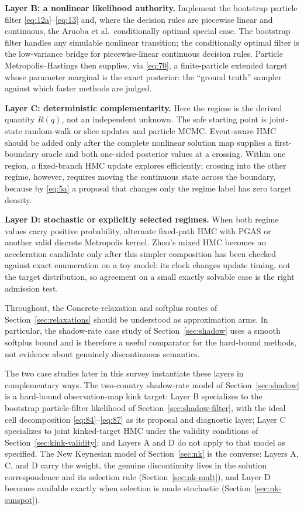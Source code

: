 \documentclass[11pt]{article}
\begin{document}
\textbf{Layer B: a nonlinear likelihood authority.} Implement the bootstrap
particle filter \eqref{eq:12a}--\eqref{eq:13} and, where the decision rules are
piecewise linear and continuous, the Aruoba et al.\ conditionally optimal
special case. The bootstrap filter handles any simulable nonlinear transition;
the conditionally optimal filter is the low-variance bridge for
piecewise-linear continuous decision rules. Particle Metropolis--Hastings then
supplies, via \eqref{eq:70}, a finite-particle extended target whose parameter
marginal is the exact posterior: the ``ground truth'' sampler against which
faster methods are judged.

\textbf{Layer C: deterministic complementarity.} Here the regime is the derived
quantity $R(q)$, not an independent unknown. The safe starting point is
joint-state random-walk or slice updates and particle MCMC. Event-aware HMC
should be added only after the complete nonlinear solution map supplies a
first-boundary oracle and both one-sided posterior values at a crossing.
Within one region, a fixed-branch HMC update explores efficiently; crossing
into the other regime, however, requires moving the continuous state across
the boundary, because by \eqref{eq:5a} a proposal that changes only the
regime label has zero target density.

\textbf{Layer D: stochastic or explicitly selected regimes.} When both regime
values carry positive probability, alternate fixed-path HMC with PGAS or
another valid discrete Metropolis kernel. Zhou's mixed HMC becomes an
acceleration candidate only after this simpler composition has been checked
against exact enumeration on a toy model: its clock changes update timing, not
the target distribution, so agreement on a small exactly solvable case is the
right admission test.

Throughout, the Concrete-relaxation and softplus routes of
Section~\ref{sec:relaxations} should be understood as approximation arms. In
particular, the shadow-rate case study of Section~\ref{sec:shadow} uses a smooth
softplus bound and is therefore a useful comparator for the hard-bound methods,
not evidence about genuinely discontinuous semantics.

The two case studies later in this survey instantiate these layers in
complementary ways. The two-country shadow-rate model of Section~\ref{sec:shadow} is a
hard-bound observation-map kink target: Layer B specializes to the bootstrap
particle-filter likelihood of Section~\ref{sec:shadow-filter}, with the ideal cell
decomposition \eqref{eq:84}--\eqref{eq:87} as its proposal and diagnostic
layer; Layer C specializes to joint kinked-target HMC under the validity
conditions of Section~\ref{sec:kink-validity}; and Layers A and D do not apply to that
model as specified. The New Keynesian model of Section~\ref{sec:nk} is the converse:
Layers A, C, and D carry the weight, the genuine discontinuity lives in the
solution correspondence and its selection rule (Section~\ref{sec:nk-mult}), and Layer D
becomes available exactly when selection is made stochastic
(Section~\ref{sec:nk-sunspot}).
\end{document}
